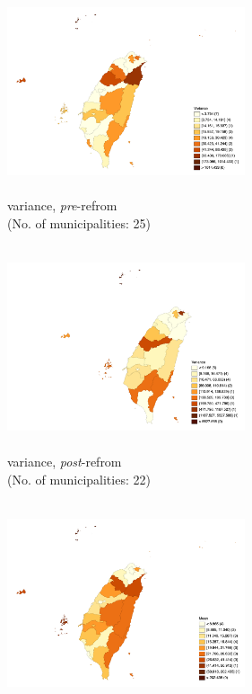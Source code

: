 \begin{figure}
    \centering
    \begin{subfigure}[t]{0.48\textwidth}
    \includegraphics[width=7cm, height=6cm]{04-Chapter-Four/image/figure4-1.png}
    \caption{variance, \textit{pre}-refrom  \\ (No. of municipalities: 25)}
    \label{fig:figure4-1}    
    \end{subfigure}    
    \begin{subfigure}[t]{0.48\textwidth}
    \includegraphics[width=7cm, height=6cm]{04-Chapter-Four/image/figure4-2.png}
    \caption{variance, \textit{post}-refrom \\ (No. of municipalities: 22)} 
    \label{fig:figure4-2}
    \end{subfigure}
    \centering
    \begin{subfigure}[t]{0.48\textwidth}
    \includegraphics[width=7cm, height=6cm]{04-Chapter-Four/image/figure4-3.png}

\end{subfigure}
\end{figure}
